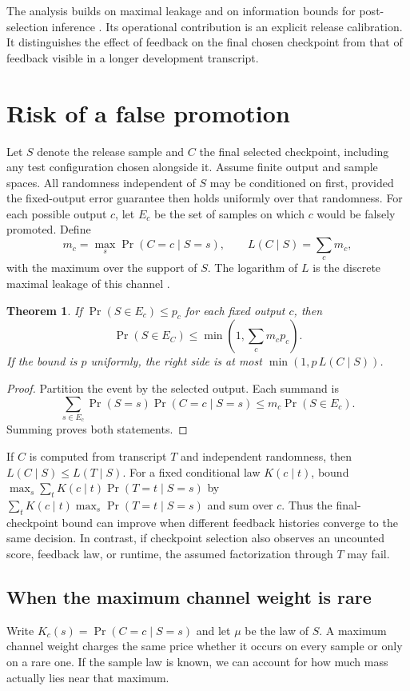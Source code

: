 \documentclass[11pt]{article}
\newtheorem{theorem}{Theorem}
\begin{document}
The analysis builds on maximal leakage \cite{issa} and on information
bounds for post-selection inference \cite{rogers}. Its operational
contribution is an explicit release calibration. It distinguishes the
effect of feedback on the final chosen checkpoint from that of
feedback visible in a longer development transcript.

\section{Risk of a false promotion}
Let $S$ denote the release sample and $C$ the final selected checkpoint,
including any test configuration chosen alongside it. Assume finite
output and sample spaces. All randomness independent of $S$ may be
conditioned on first, provided the fixed-output error guarantee then
holds uniformly over that randomness. For each possible output $c$, let
$E_c$ be the set of samples on which $c$ would be falsely promoted.
Define
\[
m_c=\max_s\Pr(C=c\mid S=s),\qquad L(C\mid S)=\sum_c m_c ,
\]
with the maximum over the support of $S$. The logarithm of $L$ is
the discrete maximal leakage of this channel \cite{issa}.

\begin{theorem}
If $\Pr(S\in E_c)\le p_c$ for each fixed output $c$, then
\[
\Pr(S\in E_C)\le\min\!\left(1,\sum_c m_c p_c\right).
\]
If the bound is $p$ uniformly, the right side is at most
$\min(1,p\,L(C\mid S))$.
\end{theorem}
\begin{proof}
Partition the event by the selected output. Each summand is
\[
\sum_{s\in E_c}\Pr(S=s)\Pr(C=c\mid S=s)
 \le m_c\Pr(S\in E_c).
\]
Summing proves both statements.
\end{proof}

If $C$ is computed from transcript $T$ and independent randomness, then
$L(C\mid S)\le L(T\mid S)$. For a fixed conditional law
$K(c\mid t)$, bound
$\max_s\sum_t K(c\mid t)\Pr(T=t\mid S=s)$ by
$\sum_t K(c\mid t)\max_s\Pr(T=t\mid S=s)$ and sum over $c$.
Thus the final-checkpoint bound can improve when different feedback
histories converge to the same decision. In contrast, if checkpoint
selection also observes an uncounted score, feedback law, or runtime,
the assumed factorization through $T$ may fail.

\subsection{When the maximum channel weight is rare}
Write $K_c(s)=\Pr(C=c\mid S=s)$ and let $\mu$ be the law of $S$.
A maximum channel weight charges the same price whether it occurs
on every sample or only on a rare one. If the sample law is known,
we can account for how much mass actually lies near that maximum.
\end{document}
